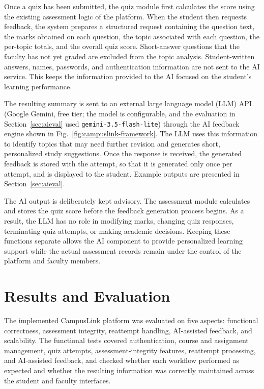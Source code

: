\documentclass[conference]{IEEEtran}
\begin{document}
Once a quiz has been submitted, the quiz module first calculates the score using the existing assessment logic of the platform. When the student then requests feedback, the system prepares a structured request containing the question text, the marks obtained on each question, the topic associated with each question, the per-topic totals, and the overall quiz score. Short-answer questions that the faculty has not yet graded are excluded from the topic analysis. Student-written answers, names, passwords, and authentication information are not sent to the AI service. This keeps the information provided to the AI focused on the student's learning performance.

The resulting summary is sent to an external large language model (LLM) API (Google Gemini, free tier; the model is configurable, and the evaluation in Section~\ref{sec:aieval} used \texttt{gemini-3.5-flash-lite}) through the AI feedback engine shown in Fig.~\ref{fig:campuslink-framework}. The LLM uses this information to identify topics that may need further revision and generates short, personalized study suggestions. Once the response is received, the generated feedback is stored with the attempt, so that it is generated only once per attempt, and is displayed to the student. Example outputs are presented in Section~\ref{sec:aieval}.

The AI output is deliberately kept advisory. The assessment module calculates and stores the quiz score before the feedback generation process begins. As a result, the LLM has no role in modifying marks, changing quiz responses, terminating quiz attempts, or making academic decisions. Keeping these functions separate allows the AI component to provide personalized learning support while the actual assessment records remain under the control of the platform and faculty members.

\section{Results and Evaluation}
\label{sec:results}

The implemented CampusLink platform was evaluated on five aspects: functional correctness, assessment integrity, reattempt handling, AI-assisted feedback, and scalability. The functional tests covered authentication, course and assignment management, quiz attempts, assessment-integrity features, reattempt processing, and AI-assisted feedback, and checked whether each workflow performed as expected and whether the resulting information was correctly maintained across the student and faculty interfaces.
\end{document}

